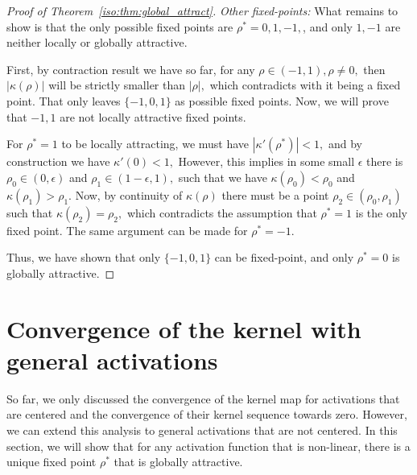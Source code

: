 \begin{proof}[Proof of Theorem~\ref{iso:thm:global_attract}]
\textit{Other fixed-points:}
What remains to show is that the only possible fixed points are $\rho^*=0,1,-1,$, and only $1,-1$ are neither locally or globally attractive.  

First, by contraction result we have so far, for any $\rho \in (-1,1),\rho\neq 0,$ then $|\kappa(\rho)|$ will be strictly smaller than $|\rho|,$ which contradicts with it being a fixed point. That only leaves $\{-1,0,1\}$ as possible fixed points. Now, we will prove that $-1,1$ are not locally attractive fixed points. 

For $\rho^*=1$ to be locally attracting, we must have $|\kappa'(\rho^*)|<1,$ and by construction we have $\kappa'(0)<1,$ However, this implies in some small $\epsilon$ there is $\rho_0\in(0,\epsilon)$ and $\rho_1 \in (1-\epsilon,1),$ such that we have $\kappa(\rho_0) < \rho_0$ and $\kappa(\rho_1) > \rho_1.$ Now, by continuity of $\kappa(\rho)$ there must be a point $\rho_2\in (\rho_0,\rho_1)$ such that $\kappa(\rho_2) = \rho_2,$ which contradicts the assumption that $\rho^*=1$ is the only fixed point. The same argument can be made for $\rho^*=-1.$ 

Thus, we have shown that only $\{-1,0,1\}$ can be fixed-point, and only $\rho^*=0$ is globally attractive.
\end{proof}



\section{Convergence of the kernel with general activations}
So far, we only discussed the convergence of the kernel map for activations that are centered and the convergence of their kernel sequence towards zero. However, we can extend this analysis to general activations that are not centered. In this section, we will show that for any activation function that is non-linear, there is a unique fixed point $\rho^*$ that is globally attractive.


